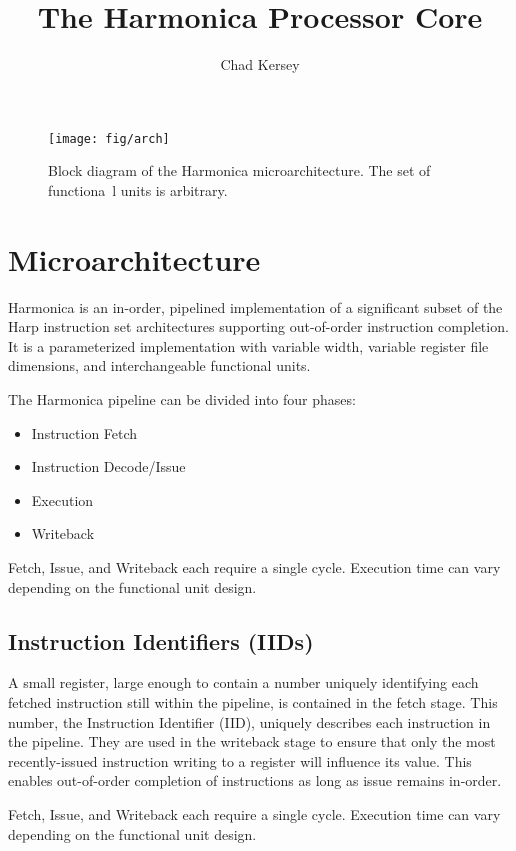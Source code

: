 \documentclass[10pt,twocolumn]{article}
\title{The Harmonica Processor Core}
\author{Chad Kersey}
\begin{document}
\maketitle

\begin{figure*}
\begin{center}
\texttt{[image: fig/arch]}
\caption{Block diagram of the Harmonica microarchitecture. The set of functiona\
l units is arbitrary.}
\label{fig:arch}
\end{center}
\end{figure*}


\section{Microarchitecture}
Harmonica is an in-order, pipelined implementation of a significant subset of the Harp instruction set architectures supporting out-of-order instruction completion.
It is a parameterized implementation with variable width, variable register file dimensions, and interchangeable functional units.

The Harmonica pipeline can be divided into four phases:
\begin{itemize}
  \item Instruction Fetch
  \item Instruction Decode/Issue
  \item Execution
  \item Writeback
\end{itemize}

Fetch, Issue, and Writeback each require a single cycle.
Execution time can vary depending on the functional unit design.


\subsection{Instruction Identifiers (IIDs)}
A small register, large enough to contain a number uniquely identifying each fetched instruction still within the pipeline, is contained in the fetch stage.
This number, the Instruction Identifier (IID), uniquely describes each instruction in the pipeline.
They are used in the writeback stage to ensure that only the most recently-issued instruction writing to a register will influence its value.
This enables out-of-order completion of instructions as long as issue remains in-order.

Fetch, Issue, and Writeback each require a single cycle.
Execution time can vary depending on the functional unit design.
\end{document}
